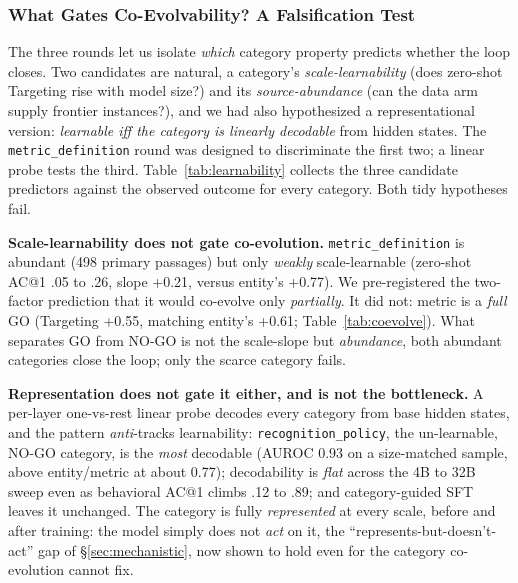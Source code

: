 \subsubsection{What Gates Co-Evolvability? A Falsification Test}
\label{sec:learnability}

The three rounds let us isolate \emph{which} category property predicts whether the loop
closes. Two candidates are natural, a category's \emph{scale-learnability} (does
zero-shot Targeting rise with model size?) and its \emph{source-abundance} (can the
data arm supply frontier instances?), and we had also hypothesized a
representational version: \emph{learnable iff the category is linearly decodable} from
hidden states. The \texttt{metric\_definition} round was designed to discriminate the
first two; a linear probe tests the third. Table~\ref{tab:learnability} collects the three
candidate predictors against the observed outcome for every category. Both tidy hypotheses fail.

\textbf{Scale-learnability does not gate co-evolution.} \texttt{metric\_definition}
is abundant (498 primary passages) but only \emph{weakly} scale-learnable
(zero-shot AC@1 .05 to .26, slope +0.21, versus entity's +0.77). We
pre-registered the two-factor prediction that it would co-evolve only
\emph{partially}. It did not: metric is a \emph{full} GO (Targeting +0.55, matching
entity's +0.61; Table~\ref{tab:coevolve}). What separates GO from NO-GO is not the
scale-slope but \emph{abundance}, both abundant categories close the loop; only the scarce
category fails.

\textbf{Representation does not gate it either, and is not the bottleneck.} A
per-layer one-vs-rest linear probe decodes every category from base hidden states, and
the pattern \emph{anti}-tracks learnability: \texttt{recognition\_policy}, the
un-learnable, NO-GO category, is the \emph{most} decodable (AUROC 0.93 on a
size-matched sample, above entity/metric at about 0.77); decodability is \emph{flat}
across the 4B to 32B sweep even as behavioral AC@1 climbs
.12 to .89; and category-guided SFT leaves it unchanged. The category is fully
\emph{represented} at every scale, before and after training: the model simply does
not \emph{act} on it, the ``represents-but-doesn't-act'' gap of
\S\ref{sec:mechanistic}, now shown to hold even for the category co-evolution cannot fix.


